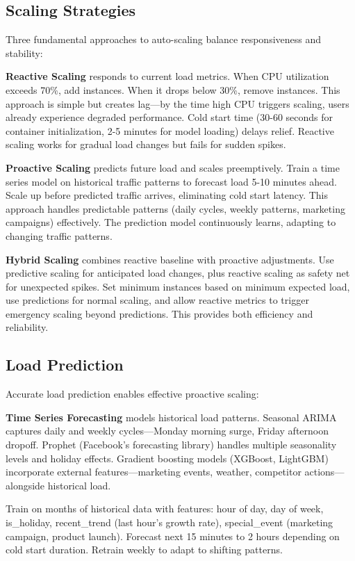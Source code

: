 \subsection{Scaling Strategies}

Three fundamental approaches to auto-scaling balance responsiveness and stability:

\textbf{Reactive Scaling} responds to current load metrics. When CPU utilization exceeds 70\%, add instances. When it drops below 30\%, remove instances. This approach is simple but creates lag---by the time high CPU triggers scaling, users already experience degraded performance. Cold start time (30-60 seconds for container initialization, 2-5 minutes for model loading) delays relief. Reactive scaling works for gradual load changes but fails for sudden spikes.

\textbf{Proactive Scaling} predicts future load and scales preemptively. Train a time series model on historical traffic patterns to forecast load 5-10 minutes ahead. Scale up before predicted traffic arrives, eliminating cold start latency. This approach handles predictable patterns (daily cycles, weekly patterns, marketing campaigns) effectively. The prediction model continuously learns, adapting to changing traffic patterns.

\textbf{Hybrid Scaling} combines reactive baseline with proactive adjustments. Use predictive scaling for anticipated load changes, plus reactive scaling as safety net for unexpected spikes. Set minimum instances based on minimum expected load, use predictions for normal scaling, and allow reactive metrics to trigger emergency scaling beyond predictions. This provides both efficiency and reliability.

\subsection{Load Prediction}

Accurate load prediction enables effective proactive scaling:

\textbf{Time Series Forecasting} models historical load patterns. Seasonal ARIMA captures daily and weekly cycles---Monday morning surge, Friday afternoon dropoff. Prophet (Facebook's forecasting library) handles multiple seasonality levels and holiday effects. Gradient boosting models (XGBoost, LightGBM) incorporate external features---marketing events, weather, competitor actions---alongside historical load.

Train on months of historical data with features: hour of day, day of week, is\_holiday, recent\_trend (last hour's growth rate), special\_event (marketing campaign, product launch). Forecast next 15 minutes to 2 hours depending on cold start duration. Retrain weekly to adapt to shifting patterns.

